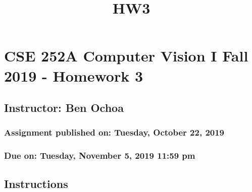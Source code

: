 \documentclass[11pt]{article}
\title{HW3}
\begin{document}
    
    \maketitle
    
    

    
    \hypertarget{cse-252a-computer-vision-i-fall-2019---homework-3}{%
\section{CSE 252A Computer Vision I Fall 2019 - Homework
3}\label{cse-252a-computer-vision-i-fall-2019---homework-3}}

\hypertarget{instructor-ben-ochoa}{%
\subsection{Instructor: Ben Ochoa}\label{instructor-ben-ochoa}}

\hypertarget{assignment-published-on-tuesday-october-22-2019}{%
\subsubsection{Assignment published on: Tuesday, October 22,
2019}\label{assignment-published-on-tuesday-october-22-2019}}

\hypertarget{due-on-tuesday-november-5-2019-1159-pm}{%
\subsubsection{Due on: Tuesday, November 5, 2019 11:59
pm}\label{due-on-tuesday-november-5-2019-1159-pm}}

\hypertarget{instructions}{%
\subsection{Instructions}\label{instructions}}
\end{document}
